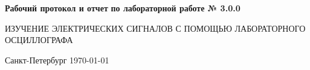 \documentclass[12pt, a4paper]{article}%
\begin{document}
\begin{titlepage}
		\vspace{7em}

		\begin{center}
			\Large \textbf{Рабочий протокол и отчет} \linebreak
			\textbf{по лабораторной работе № 3.0.0}
		\end{center}

		\vspace{0.02em}

		\begin{center}
			\large
			ИЗУЧЕНИЕ ЭЛЕКТРИЧЕСКИХ СИГНАЛОВ \linebreak
			С ПОМОЩЬЮ ЛАБОРАТОРНОГО ОСЦИЛЛОГРАФА
		\end{center}



		\vspace{\fill}

		\begin{center}
			Санкт-Петербург \yeardate \today
		\end{center}
	\end{titlepage}
\end{document}
